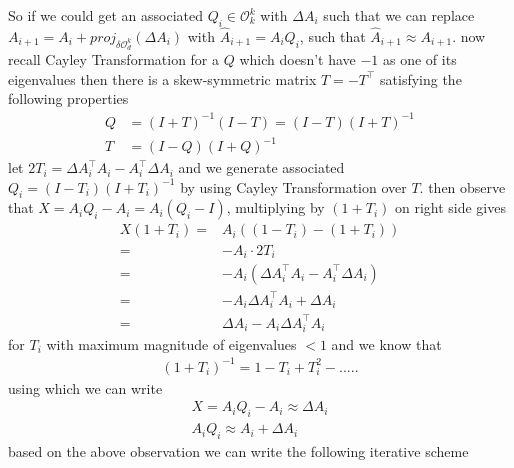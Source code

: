 So if we could get an associated $Q_i \in \mathcal{O}_k^k$ with $\Delta A_i$ such that we can replace $A_{i+1} = A_i+proj_{\delta \mathcal{O}_d^k}(\Delta A_i)$ with $\hat{A}_{i+1} = A_iQ_i$, such that $\hat{A}_{i+1} \approx A_{i+1}$.
\newline \newline now recall Cayley Transformation for a $Q$ which doesn't have $-1$ as one of its eigenvalues then there is a skew-symmetric matrix $T = -T^\top$ satisfying the following properties
\begin{equation} \label{cayley-transformation} 
\begin{aligned}
    Q &= (I+T)^{-1}(I-T) = (I-T)(I+T)^{-1} \\
    T &= (I-Q)(I+Q)^{-1}
\end{aligned}
\end{equation}
let $2T_i = \Delta A_i^\top A_i- A_i^\top \Delta A_i$ and we generate associated $Q_i = (I-T_i)(I+T_i)^{-1}$ by using Cayley Transformation over $T$.
\newline then observe that $X = A_iQ_i-A_i = A_i(Q_i-I)$, multiplying by $(1+T_i)$ on right side gives 
\begin{equation}
\begin{aligned}
    X(1+T_i) =& A_i((1-T_i)-(1+T_i)) \\
    =& -A_i\cdot 2T_i \\
    =& -A_i(\Delta A_i^\top A_i- A_i^\top \Delta A_i) \\
    =&  -A_i\Delta A_i^\top A_i+ \Delta A_i \\
    =& \Delta A_i - A_i\Delta A_i^\top A_i
\end{aligned}
\end{equation}
for $T_i$ with maximum magnitude of eigenvalues $ < 1$ and we know that  
\begin{equation}
\begin{aligned}
    (1+T_i)^{-1} = 1 - T_i +T^2_i - .....
\end{aligned}
\end{equation}
using which we can write
\begin{equation}
\begin{aligned}
     X = A_iQ_i-A_i \approx \Delta A_i\\
     A_iQ_i \approx A_i + \Delta A_i
\end{aligned}
\end{equation}
\newline based on the above observation we can write the following iterative scheme

